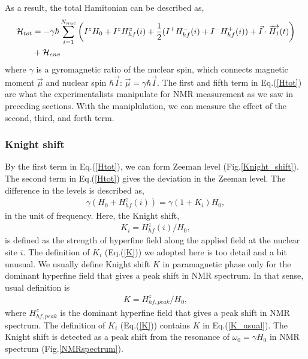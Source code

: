 As a result, the total Hamitonian can be described as,
\begin{align}
\mathcal{H}_{tot} &= -\gamma\hbar\sum^{N_{nuc}}_{i = 1} \left(I^zH_0 + I^zH^z_{hf}(i)
 + \frac{1}{2}(I^+H^-_{hf}(i)+I^-H^+_{hf}(i))+\vec{I}\cdot\overrightarrow{H_1}(t)\right) \label{Htot}\\
 & + \mathcal{H}_{env} \notag
\end{align}
where $\gamma$ is a gyromagnetic ratio of the nuclear spin, which connects magnetic moment $\vec{\mu}$ and nuclear spin $\hbar\vec{I}$: $\vec{\mu} = \gamma\hbar\vec{I}$.
The first and fifth term in Eq.(\ref{Htot}) are what the experimentalists manipulate for NMR measurement as we saw in preceding sections.
With the maniplulation, we can measure the effect of the second, third, and forth term.

\subsubsection{Knight shift}
By the first term in Eq.(\ref{Htot}), we can form Zeeman level (Fig.\ref{Knight_shift}).
The second term in Eq.(\ref{Htot}) gives the deviation in the Zeeman level.
The difference in the levels is described as,
\begin{align}
\gamma (H_0 + H^z_{hf}(i)) = \gamma (1 + K_i)H_0,
\end{align}
in the unit of frequency.
Here, the Knight shift,
\begin{align}
\label{K}
K_i = H^z_{hf}(i)/H_0,
\end{align}
is defined as the strength of hyperfine field along the applied field at the nuclear site $i$.
The definition of $K_i$ (Eq.(\ref{K})) we adopted here is too detail and a bit unusual.
We usually define Knight shift $K$ in paramagnetic phase only for the dominant hyperfine field that gives a peak shift in NMR spectrum.
In that sense, usual definition is
\begin{align}
\label{K_usual}
K = H^z_{hf, peak}/H_0,
\end{align}
where $H^z_{hf, peak}$ is the dominant hyperfine field that gives a peak shift in NMR spectrum.
The definition of $K_i$ (Eq.(\ref{K})) contains $K$ in Eq.(\ref{K_usual}).
The Knight shift is detected as a peak shift from the resonance of $\omega_0 = \gamma H_0$ in NMR spectrum (Fig.\ref{NMRspectrum}).

